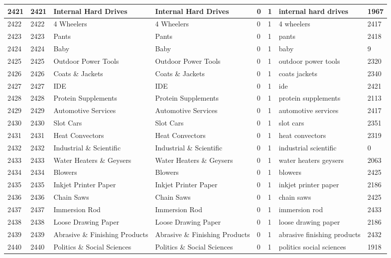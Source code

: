 \begin{longtable}{|l|l|l|l|l|l|l|l|}
2421 & 2421 & Internal Hard Drives & Internal Hard Drives & 0 & 1 & internal hard drives & 1967 \\ \hline 
2422 & 2422 & 4 Wheelers & 4 Wheelers & 0 & 1 & 4 wheelers & 2417 \\ \hline 
2423 & 2423 & Pants & Pants & 0 & 1 & pants & 2418 \\ \hline 
2424 & 2424 & Baby & Baby & 0 & 1 & baby & 9 \\ \hline 
2425 & 2425 & Outdoor Power Tools & Outdoor Power Tools & 0 & 1 & outdoor power tools & 2320 \\ \hline 
2426 & 2426 & Coats \& Jackets & Coats \& Jackets & 0 & 1 & coats jackets & 2340 \\ \hline 
2427 & 2427 & IDE & IDE & 0 & 1 & ide & 2421 \\ \hline 
2428 & 2428 & Protein Supplements & Protein Supplements & 0 & 1 & protein supplements & 2113 \\ \hline 
2429 & 2429 & Automotive Services & Automotive Services & 0 & 1 & automotive services & 2417 \\ \hline 
2430 & 2430 & Slot Cars & Slot Cars & 0 & 1 & slot cars & 2351 \\ \hline 
2431 & 2431 & Heat Convectors & Heat Convectors & 0 & 1 & heat convectors & 2319 \\ \hline 
2432 & 2432 & Industrial \& Scientific & Industrial \& Scientific & 0 & 1 & industrial scientific & 0 \\ \hline 
2433 & 2433 & Water Heaters \& Geysers & Water Heaters \& Geysers & 0 & 1 & water heaters geysers & 2063 \\ \hline 
2434 & 2434 & Blowers & Blowers & 0 & 1 & blowers & 2425 \\ \hline 
2435 & 2435 & Inkjet Printer Paper & Inkjet Printer Paper & 0 & 1 & inkjet printer paper & 2186 \\ \hline 
2436 & 2436 & Chain Saws & Chain Saws & 0 & 1 & chain saws & 2425 \\ \hline 
2437 & 2437 & Immersion Rod & Immersion Rod & 0 & 1 & immersion rod & 2433 \\ \hline 
2438 & 2438 & Loose Drawing Paper & Loose Drawing Paper & 0 & 1 & loose drawing paper & 2186 \\ \hline 
2439 & 2439 & Abrasive \& Finishing Products & Abrasive \& Finishing Products & 0 & 1 & abrasive finishing products & 2432 \\ \hline 
2440 & 2440 & Politics \& Social Sciences & Politics \& Social Sciences & 0 & 1 & politics social sciences & 1918 \\ \hline 

\end{longtable}
